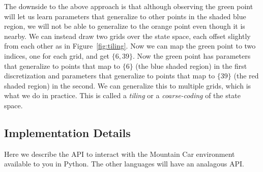 \documentclass[11pt]{article}
\numberwithin{equation}{section} %
\numberwithin{figure}{section} %
\numberwithin{table}{section} %
\begin{document}
The downside to the above approach is that although observing the green point will let us learn parameters that generalize to other points in the shaded blue region, we will not be able to generalize to the orange point even though it is nearby. We can instead draw two grids over the state space, each offset slightly from each other as in Figure~\ref{fig:tiling}. Now we can map the green point to two indices, one for each grid, and get $\{6, 39\}$. Now the green point has parameters that generalize to points that map to $\{6\}$ (the blue shaded region) in the first discretization and parameters that generalize to points that map to $\{39\}$ (the red shaded region) in the second. We can generalize this to multiple grids, which is what we do in practice. This is called a \emph{tiling} or a \emph{coarse-coding} of the state space. 


\subsection{Implementation Details}
Here we describe the API to interact with the Mountain Car environment available to you in Python. The other languages will have an analagous API.
\end{document}
